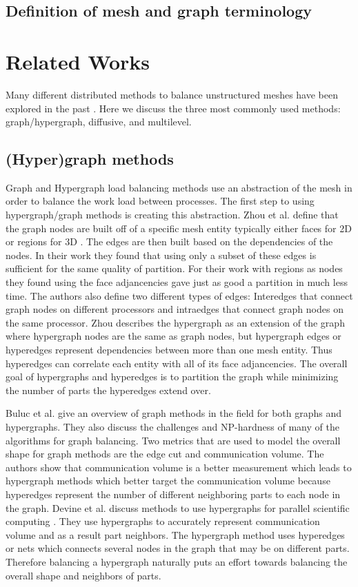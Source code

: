 \documentclass{thesis}
\begin{document}
\section{Definition of mesh and graph terminology} 


\chapter{Related Works}
Many different distributed methods to balance unstructured meshes have been 
explored in the past \cite{multidiffuse,surveygraph}. Here we discuss the 
three most commonly used methods: graph/hypergraph, diffusive, and multilevel.

\section{(Hyper)graph methods}
Graph and Hypergraph load balancing methods use an abstraction of the mesh in 
order to balance the work load between processes. The first step to using 
hypergraph/graph methods is creating this abstraction. Zhou et al. define that 
the graph nodes are built off of a specific mesh entity typically either faces 
for 2D or regions for 3D \cite{zhougraph}. The edges are then built based on the
dependencies of the nodes. In their work they found that using only a subset of 
these edges is sufficient for the same quality of partition. For their work with
regions as nodes they found using the face adjancencies gave just as good a 
partition in much less time. The authors also define two different types of 
edges: Interedges that connect graph nodes on different processors and 
intraedges that connect graph nodes on the same processor. Zhou describes the 
hypergraph as an extension of the graph where hypergraph nodes are the same as 
graph nodes, but hypergraph edges or hyperedges represent dependencies between 
more than one mesh entity. Thus hyperedges can correlate each entity with all 
of its face adjancencies. The overall goal of hypergraphs and hyperedges is to 
partition the graph while minimizing the number of parts the hyperedges extend 
over.

Buluc et al. \cite{surveygraph} give an overview of graph methods in the field 
for both graphs and hypergraphs. They also discuss the challenges and 
NP-hardness of many of the algorithms for graph balancing. Two metrics that 
are used to model the overall shape for graph methods are the edge cut and 
communication volume. The authors show that communication volume is a better 
measurement which leads to hypergraph methods which better target the 
communication volume because hyperedges represent the number of different 
neighboring parts to each node in the graph. Devine et al. discuss methods 
to use hypergraphs for parallel scientific computing \cite{hypergraph}. They
use hypergraphs to accurately represent communication volume and as a result
part neighbors. The hypergraph method uses hyperedges or nets which connects 
several nodes in the graph that may be on different parts. Therefore 
balancing a hypergraph naturally puts an effort towards balancing the overall
shape and neighbors of parts. 
\end{document}
